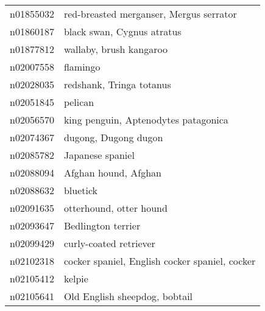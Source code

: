 \begin{appendices}
\begin{longtabu}{X|X[4]}
    		n01855032 &                                                                                    red-breasted merganser, Mergus serrator \tabularnewline
    		n01860187 &                                                                                                 black swan, Cygnus atratus \tabularnewline
    		n01877812 &                                                                                                    wallaby, brush kangaroo \tabularnewline
    		n02007558 &                                                                                                                   flamingo \tabularnewline
    		n02028035 &                                                                                                   redshank, Tringa totanus \tabularnewline
    		n02051845 &                                                                                                                    pelican \tabularnewline
    		n02056570 &                                                                                       king penguin, Aptenodytes patagonica \tabularnewline
    		n02074367 &                                                                                                       dugong, Dugong dugon \tabularnewline
    		n02085782 &                                                                                                           Japanese spaniel \tabularnewline
    		n02088094 &                                                                                                       Afghan hound, Afghan \tabularnewline
    		n02088632 &                                                                                                                   bluetick \tabularnewline
    		n02091635 &                                                                                                    otterhound, otter hound \tabularnewline
    		n02093647 &                                                                                                         Bedlington terrier \tabularnewline
    		n02099429 &                                                                                                     curly-coated retriever \tabularnewline
    		n02102318 &                                                                             cocker spaniel, English cocker spaniel, cocker \tabularnewline
    		n02105412 &                                                                                                                     kelpie \tabularnewline
    		n02105641 &                                                                                              Old English sheepdog, bobtail \tabularnewline

\end{longtabu}
\end{appendices}
